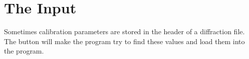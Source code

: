 \section{\texorpdfstring{The  Input}
    {The ''Get From Header'' Input}}

Sometimes calibration parameters are stored in the header of
a diffraction file.  The  button will 
make the program try to find these values and load them into the 
program.
